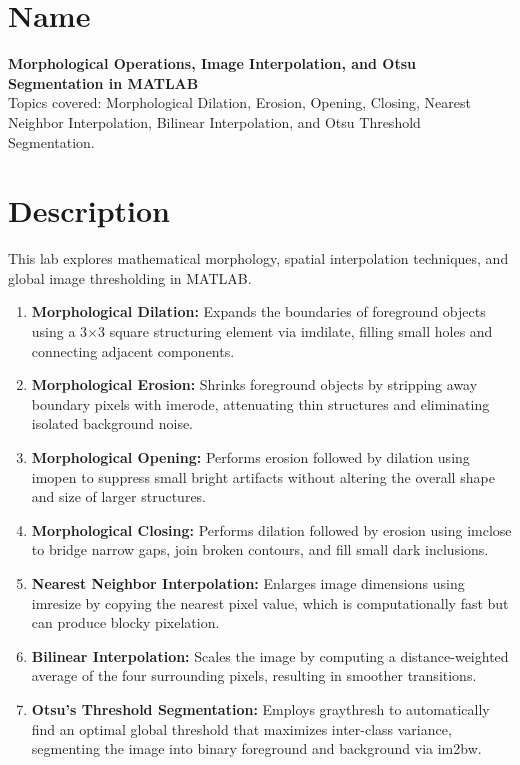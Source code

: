 \documentclass[12pt,a4paper]{article}
\begin{document}

\section{Name}

\textbf{Morphological Operations, Image Interpolation, and Otsu Segmentation in MATLAB}\\[0.3em]
Topics covered: Morphological Dilation, Erosion, Opening, Closing, Nearest Neighbor Interpolation, Bilinear Interpolation, and Otsu Threshold Segmentation.


\section{Description}

This lab explores mathematical morphology, spatial interpolation techniques, and global image thresholding in MATLAB.

\begin{enumerate}
  \item \textbf{Morphological Dilation:} Expands the boundaries of foreground objects using a 3$\times$3 square structuring element via imdilate, filling small holes and connecting adjacent components.

  \item \textbf{Morphological Erosion:} Shrinks foreground objects by stripping away boundary pixels with imerode, attenuating thin structures and eliminating isolated background noise.

  \item \textbf{Morphological Opening:} Performs erosion followed by dilation using imopen to suppress small bright artifacts without altering the overall shape and size of larger structures.

  \item \textbf{Morphological Closing:} Performs dilation followed by erosion using imclose to bridge narrow gaps, join broken contours, and fill small dark inclusions.

  \item \textbf{Nearest Neighbor Interpolation:} Enlarges image dimensions using imresize by copying the nearest pixel value, which is computationally fast but can produce blocky pixelation.

  \item \textbf{Bilinear Interpolation:} Scales the image by computing a distance-weighted average of the four surrounding pixels, resulting in smoother transitions.

  \item \textbf{Otsu's Threshold Segmentation:} Employs graythresh to automatically find an optimal global threshold that maximizes inter-class variance, segmenting the image into binary foreground and background via im2bw.
\end{enumerate}
\end{document}
